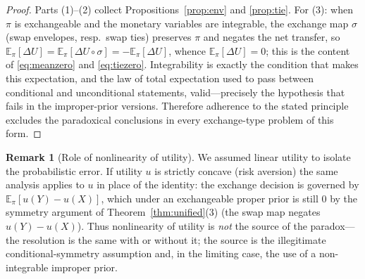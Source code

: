 \documentclass{amsart}
\theoremstyle{plain}
\theoremstyle{definition}
\newtheorem{remark}{Remark}
\begin{document}
\begin{proof}
Parts (1)--(2) collect Propositions~\ref{prop:env} and \ref{prop:tie}. For (3):
when $\pi$ is exchangeable and the monetary variables are integrable, the
exchange map $\sigma$ (swap envelopes, resp.\ swap ties) preserves $\pi$ and
negates the net transfer, so
$\mathbb E_\pi[\Delta U]=\mathbb E_\pi[\Delta U\circ\sigma]=-\mathbb E_\pi[\Delta U]$,
whence $\mathbb E_\pi[\Delta U]=0$; this is the content of \eqref{eq:meanzero}
and \eqref{eq:tiezero}. Integrability is exactly the condition that makes this
expectation, and the law of total expectation used to pass between conditional
and unconditional statements, valid---precisely the hypothesis that fails in the
improper-prior versions. Therefore adherence to the stated principle excludes the
paradoxical conclusions in every exchange-type problem of this form.
\end{proof}

\begin{remark}[Role of nonlinearity of utility]\label{rem:utility}
We assumed linear utility to isolate the probabilistic error. If utility $u$ is
strictly concave (risk aversion) the same analysis applies to $u$ in place of the
identity: the exchange decision is governed by $\mathbb E_\pi[u(Y)-u(X)]$, which
under an exchangeable proper prior is still $0$ by the symmetry argument of
Theorem~\ref{thm:unified}(3) (the swap map negates $u(Y)-u(X)$). Thus
nonlinearity of utility is \emph{not} the source of the paradox---the resolution
is the same with or without it; the source is the illegitimate
conditional-symmetry assumption and, in the limiting case, the use of a
non-integrable improper prior.
\end{remark}
\end{document}
